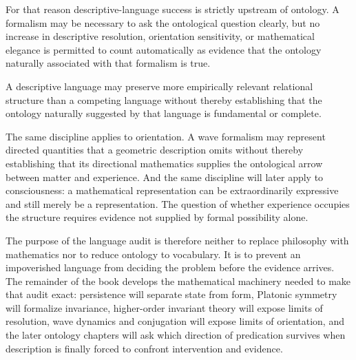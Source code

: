 For that reason descriptive-language success is strictly upstream of ontology. A formalism may be necessary to ask the ontological question clearly, but no increase in descriptive resolution, orientation sensitivity, or mathematical elegance is permitted to count automatically as evidence that the ontology naturally associated with that formalism is true.

\begin{principle}
A descriptive language may preserve more empirically relevant relational structure than a competing language without thereby establishing that the ontology naturally suggested by that language is fundamental or complete.
\end{principle}

The same discipline applies to orientation. A wave formalism may represent directed quantities that a geometric description omits without thereby establishing that its directional mathematics supplies the ontological arrow between matter and experience. And the same discipline will later apply to consciousness: a mathematical representation can be extraordinarily expressive and still merely be a representation. The question of whether experience occupies the structure requires evidence not supplied by formal possibility alone.

The purpose of the language audit is therefore neither to replace philosophy with mathematics nor to reduce ontology to vocabulary. It is to prevent an impoverished language from deciding the problem before the evidence arrives. The remainder of the book develops the mathematical machinery needed to make that audit exact: persistence will separate state from form, Platonic symmetry will formalize invariance, higher-order invariant theory will expose limits of resolution, wave dynamics and conjugation will expose limits of orientation, and the later ontology chapters will ask which direction of predication survives when description is finally forced to confront intervention and evidence.
